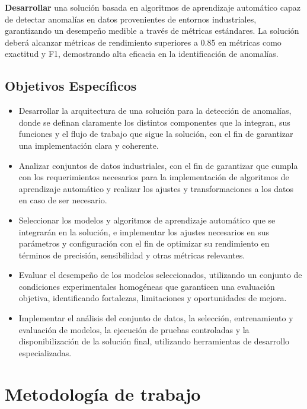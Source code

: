 \documentclass[11pt,a4paper,spanish]{book}
\numberwithin{equation}{chapter}
\numberwithin{figure}{chapter}
\begin{document}
\textbf{Desarrollar} una solución basada en algoritmos de aprendizaje automático 
capaz de detectar anomalías en datos provenientes de entornos industriales, garantizando
un desempeño medible a través de métricas estándares.
La solución deberá alcanzar métricas de rendimiento superiores a 0.85 en métricas como
exactitud y F1, demostrando alta eficacia en la identificación de anomalías.

\section{Objetivos Específicos}

\begin{itemize}

\item Desarrollar la arquitectura de una solución para la detección de anomalías, donde 
se definan claramente los distintos componentes que la integran, sus funciones y el 
flujo de trabajo que sigue la solución, con el fin de  garantizar una implementación 
clara y coherente.


\item Analizar conjuntos de datos industriales, con el fin de garantizar que cumpla 
con los requerimientos necesarios para la implementación de algoritmos de aprendizaje 
automático y realizar los ajustes y transformaciones a los datos en caso de ser necesario. 


\item Seleccionar los modelos y algoritmos de aprendizaje automático que se integrarán
en la solución, e implementar los ajustes necesarios en sus parámetros y configuración
con el fin de optimizar su rendimiento en términos de precisión, sensibilidad y otras
métricas relevantes.


\item Evaluar el desempeño de los modelos seleccionados, utilizando un conjunto de 
condiciones experimentales homogéneas que garanticen una evaluación objetiva, 
identificando fortalezas, limitaciones y oportunidades de mejora.


\item Implementar el análisis del conjunto de datos, la selección, entrenamiento y 
evaluación de modelos, la ejecución de pruebas controladas y la disponibilización de la 
solución final, utilizando herramientas de desarrollo especializadas. 

\end{itemize}


\chapter{Metodología de trabajo}
\end{document}
